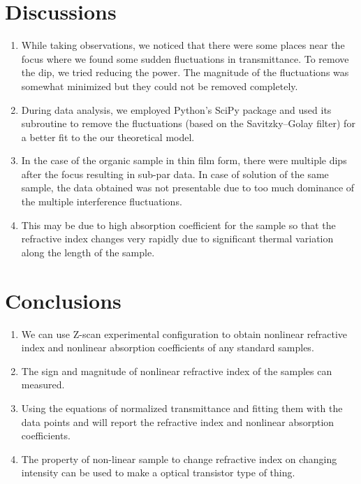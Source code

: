 \documentclass[%
 reprint,
 amsmath,amssymb,
 aps,
]{revtex4-2}
\begin{document}
\section{Discussions}
	\begin{enumerate}
		\item While taking observations, we noticed that there were
		some places near the focus where we found some sudden fluctuations in transmittance. To remove the dip, we
		tried reducing the power. The magnitude of the fluctuations was somewhat minimized but they could not be removed completely. 
		\item During data analysis, we employed Python's SciPy package and used its subroutine to remove the fluctuations (based on the Savitzky–Golay filter) for a better fit to the our theoretical model. 
		\item In the case of the organic sample in thin film form, there were multiple dips after the focus resulting in sub-par data. In case of solution of the same sample, the data obtained was not presentable due
		to too much dominance of the multiple interference
		fluctuations. 
		\item This may be due to high absorption coefficient
		for the sample so that the refractive index changes
		very rapidly due to significant thermal variation along
		the length of the sample.
	\end{enumerate}
	
	
\section{Conclusions}
	\begin{enumerate}
		\item We can use Z-scan experimental configuration to obtain nonlinear refractive
		index and nonlinear absorption coefficients of any standard samples. 
		\item The
		sign and magnitude of nonlinear refractive index of the samples can measured. 
		\item Using the equations of normalized transmittance and fitting
		them with the data points and will report the refractive index and nonlinear
		absorption coefficients.
		\item The property of non-linear sample to change refractive index on changing intensity can be used to make a optical transistor
		type of thing.
	\end{enumerate}


\appendix
\end{document}
